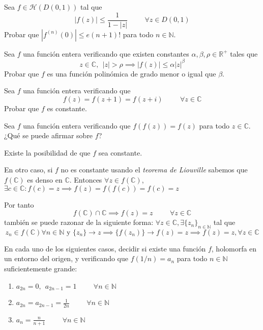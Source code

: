 \begin{ejer}
	Sea $f\in\mathcal{H}(D(0,1))$ tal que
	$$ |f(z)| \leq \frac{1}{1-|z|} \hspace{1cm} \forall z\in D(0,1) $$
	Probar que $|f^{(n)}(0)| \leq e(n+1)!$ para todo $n\in\mathbb{N}$.
\end{ejer}

\begin{ejer}
	Sea $f$ una función entera verificando que existen constantes $\alpha,\beta,\rho\in\mathbb{R}^+$ tales que
	$$ z\in\mathbb{C}, \ \ |z|>\rho \implies |f(z)| \leq \alpha |z|^{\beta} $$
	Probar que $f$ es una función polinómica de grado menor o igual que $\beta$.
\end{ejer}

\begin{ejer}
	Sea $f$ una función entera verificando que
	$$ f(z) = f(z+1)=f(z+i) \hspace{1cm} \forall z\in\mathbb{C} $$
	Probar que $f$ es constante.
\end{ejer}

\begin{ejer}
	Sea $f$ una función entera verificando que $f(f(z))=f(z)$ para todo $z\in\mathbb{C}$. ¿Qué se puede afirmar sobre $f$?
\end{ejer}
\begin{sol}
Existe la posibilidad de que $f$ sea constante.

En otro caso, si $f$ no es constante usando el \textit{teorema de Liouville} sabemos que $f(\mathbb{C})$ es denso en $\mathbb{C}$.
Entonces
$\forall z\in f(\mathbb{C})$, $\exists c\in\mathbb{C} : f(c)=z \implies f(z) = f(f(c)) = f(c) = z$


Por tanto
$$f(\mathbb{C}) \cap \mathbb{C} \implies f(z)=z \hspace{1cm}  \forall z\in \mathbb{C}$$
también se puede razonar de la siguiente forma:
$\forall z\in\mathbb{C}, \exists \{z_n\}_{n\in\mathbb{N}}$ tal que 
$$z_n\in f(\mathbb{C}) \forall n\in\mathbb{N} \text{ y }\{z_n\}\rightarrow z \implies \{f(z_n)\}\rightarrow f(z)=z \implies f(z)=z ,\forall z\in\mathbb{C}$$
\end{sol}

\begin{ejer}
	En cada uno de los siguientes casos, decidir si existe una función $f$, holomorfa en un entorno del origen, y verificando que $f(1/n)=a_n$ para todo $n\in\mathbb{N}$ suficientemente grande:
	\begin{enumerate}[label=(\alph*)]
		\item $a_{2n} = 0, \ \ a_{2n-1}=1 \hspace{1cm} \forall n\in\mathbb{N}$
		\item $a_{2n} = a_{2n-1} = \frac{1}{2n} \hspace{1cm} \forall n\in\mathbb{N}$
		\item $a_n = \frac{n}{n+1} \hspace{1cm} \forall n\in\mathbb{N}$
	\end{enumerate}
\end{ejer}

